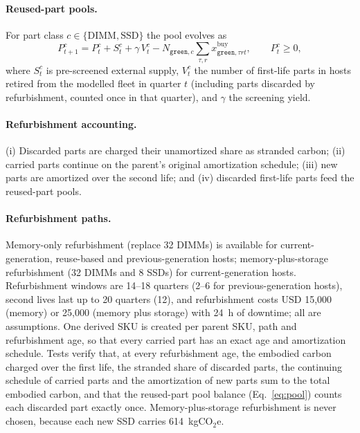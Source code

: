 \documentclass{article} %
\begin{document}
\paragraph{Reused-part pools.} For part class $c\in\{\text{DIMM}, \text{SSD}\}$ the pool evolves as
\begin{equation}
P^c_{t+1} = P^c_t + S^c_t + \gamma\, V^c_t - N_{\texttt{green},c}\sum_{\tau, r} x^{\text{buy}}_{\texttt{green},\tau r t}, \qquad P^c_t \ge 0,
\label{eq:pool}
\end{equation}
where $S^c_t$ is pre-screened external supply, $V^c_t$ the number of first-life parts in hosts retired from the modelled fleet in quarter $t$ (including parts discarded by refurbishment, counted once in that quarter), and $\gamma$ the screening yield.

\paragraph{Refurbishment accounting.} (i) Discarded parts are charged their unamortized share as stranded carbon; (ii) carried parts continue on the parent's original amortization schedule; (iii) new parts are amortized over the second life; and (iv) discarded first-life parts feed the reused-part pools.

\paragraph{Refurbishment paths.} Memory-only refurbishment (replace 32 DIMMs) is available for current-generation, reuse-based and previous-generation hosts; memory-plus-storage refurbishment (32 DIMMs and 8 SSDs) for current-generation hosts. Refurbishment windows are 14--18 quarters (2--6 for previous-generation hosts), second lives last up to 20 quarters (12), and refurbishment costs USD 15,000 (memory) or 25,000 (memory plus storage) with 24~h of downtime; all are assumptions. One derived SKU is created per parent SKU, path and refurbishment age, so that every carried part has an exact age and amortization schedule. Tests verify that, at every refurbishment age, the embodied carbon charged over the first life, the stranded share of discarded parts, the continuing schedule of carried parts and the amortization of new parts sum to the total embodied carbon, and that the reused-part pool balance (Eq.~\ref{eq:pool}) counts each discarded part exactly once. Memory-plus-storage refurbishment is never chosen, because each new SSD carries 614~kgCO$_2$e.
\end{document}
